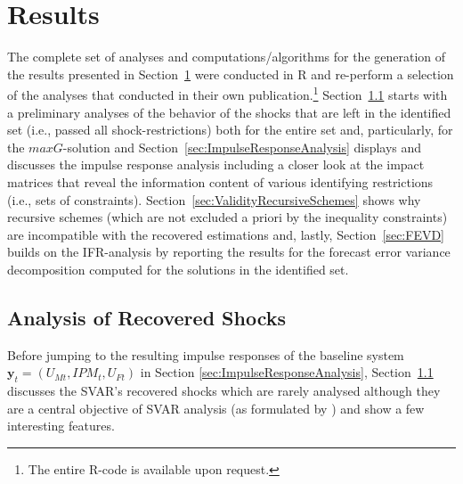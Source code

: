 \documentclass[a4paper,11pt,listof=nochaptergap,oneside,pointednumbers,bibtotoc,bigheadings,liststotoc,hidelinks]{scrbook}
\theoremstyle{mysatz}
\theoremstyle{mydefinition}
\theoremstyle{mytheorem}
\theoremstyle{mybemerkung}
\newcommand{\vect}[1]{\boldsymbol{\mathbf{#1}}}
\begin{document}
\chapter{Results}
\label{Results}

The complete set of analyses and computations/algorithms for the generation of the results presented in Section~\ref{Results} were conducted in R and re-perform a selection of the analyses that \citet{ludvigsonetal:19} conducted in their own publication.\footnote{The entire R-code is available upon request.} Section~\ref{sec:uncertaintyShocks} starts with a preliminary analyses of the behavior of the shocks that are left in the identified set (i.e., passed all shock-restrictions) both for the entire set and, particularly, for the $maxG$-solution and Section~\ref{sec:ImpulseResponseAnalysis} displays and discusses the impulse response analysis including a closer look at the impact matrices that reveal the information content of various identifying restrictions (i.e., sets of constraints). Section~\ref{sec:ValidityRecursiveSchemes} shows why recursive schemes (which are not excluded a priori by the inequality constraints) are incompatible with the recovered estimations and, lastly, Section~\ref{sec:FEVD} builds on the IFR-analysis by reporting the results for the forecast error variance decomposition computed for the solutions in the identified set.


\section{Analysis of Recovered Shocks}
\label{sec:uncertaintyShocks}

Before jumping to the resulting impulse responses of the baseline system $\vect{y}_t = (U_{Mt}, IPM_{t}, U_{Ft})$ in Section \ref{sec:ImpulseResponseAnalysis}, Section~\ref{sec:uncertaintyShocks} discusses the SVAR's recovered shocks which are rarely analysed although they are a central objective of SVAR analysis (as formulated by \citealp{ludvigsonetal:20a}) and show a few interesting features.\\
\end{document}
